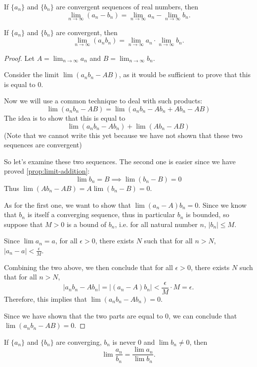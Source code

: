 \begin{corollary}
If $\{a_n\}$ and $\{b_n\}$ are convergent sequences of real numbers, then
\[ \lim_{n\to\infty}(a_n-b_n)=\lim_{n\to\infty}a_n-\lim_{n\to\infty}b_n. \]
\end{corollary}

\begin{proposition}
If $\{a_n\}$ and $\{b_n\}$ are convergent, then
\begin{equation}
\lim_{n\to\infty}(a_n b_n)=\lim_{n\to\infty}a_n\cdot\lim_{n\to\infty}b_n.
\end{equation}
\end{proposition}

\begin{proof}
Let $A=\lim_{n\to\infty}a_n$ and $B=\lim_{n\to\infty}b_n$.

Consider the limit $\lim(a_nb_n-AB)$, as it would be sufficient to prove that this is equal to $0$.

Now we will use a common technique to deal with such products:
\[ \lim(a_nb_n-AB)=\lim(a_nb_n-Ab_n+Ab_n-AB) \]
The idea is to show that this is equal to
\[ \lim(a_nb_n-Ab_n)+\lim(Ab_n-AB) \]
(Note that we cannot write this yet because we have not shown that these two sequences are convergent)

So let's examine these two sequences. The second one is easier since we have proved \cref{prop:limit-addition}:
\[ \lim b_n=B \implies \lim(b_n-B)=0 \]
Thus $\lim(Ab_n-AB)=A\lim(b_n-B)=0$.

As for the first one, we want to show that $\lim(a_n-A)b_n=0$. Since we know that $b_n$ is itself a converging sequence, thus in particular $b_n$ is bounded, so suppose that $M>0$ is a bound of $b_n$, i.e. for all natural number $n$, $|b_n|\le M$.

Since $\lim a_n=a$, for all $\epsilon>0$, there exists $N$ such that for all $n>N$, $|a_n-a|<\frac{\epsilon}{M}$.

Combining the two above, we then conclude that for all $\epsilon>0$, there exists $N$ such that for all $n>N$,
\[ |a_nb_n-Ab_n|=|(a_n-A)b_n|<\frac{\epsilon}{M}\cdot M=\epsilon. \]
Therefore, this implies that $\lim(a_nb_n-Ab_n)=0$.

Since we have shown that the two parts are equal to $0$, we can conclude that $\lim(a_nb_n-AB)=0$.
\end{proof}

\begin{proposition}
If $\{a_n\}$ and $\{b_n\}$ are converging, $b_n$ is never $0$ and $\lim b_n \neq 0$, then \[ \lim\frac{a_n}{b_n}=\frac{\lim a_n}{\lim b_n}. \]
\end{proposition}

